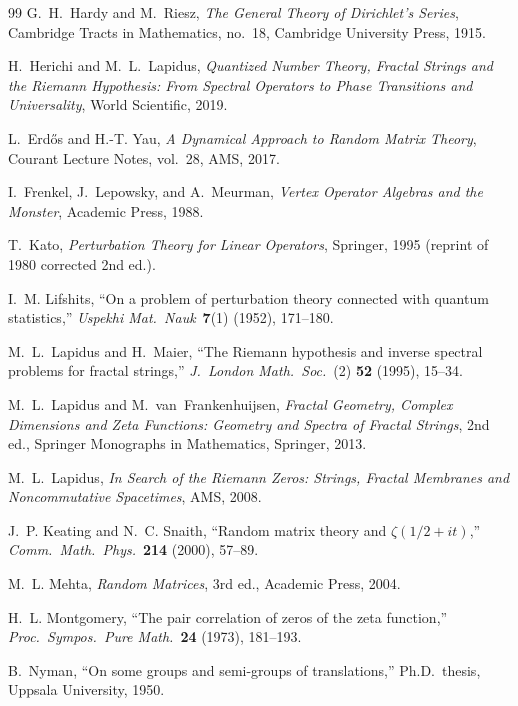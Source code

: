\documentclass[11pt,a4paper]{article}
\theoremstyle{plain}
\theoremstyle{remark}
\begin{document}
\begin{thebibliography}{99}
G.~H.~Hardy and M.~Riesz,
\emph{The General Theory of Dirichlet's Series},
Cambridge Tracts in Mathematics, no.~18, Cambridge University Press,
1915.

H.~Herichi and M.~L.~Lapidus,
\emph{Quantized Number Theory, Fractal Strings and the Riemann
Hypothesis: From Spectral Operators to Phase Transitions and
Universality},
World Scientific, 2019.

L.~Erd\H{o}s and H.-T. Yau,
\emph{A Dynamical Approach to Random Matrix Theory},
Courant Lecture Notes, vol.~28, AMS, 2017.

I.~Frenkel, J.~Lepowsky, and A.~Meurman,
\emph{Vertex Operator Algebras and the Monster},
Academic Press, 1988.

T.~Kato,
\emph{Perturbation Theory for Linear Operators},
Springer, 1995 (reprint of 1980 corrected 2nd ed.).

I.~M. Lifshits,
``On a problem of perturbation theory connected with quantum statistics,''
\emph{Uspekhi Mat.\ Nauk}\ \textbf{7}(1) (1952), 171--180.

M.~L.~Lapidus and H.~Maier,
``The Riemann hypothesis and inverse spectral problems for fractal
strings,''
\emph{J.\ London Math.\ Soc.}\ (2) \textbf{52} (1995), 15--34.

M.~L.~Lapidus and M.~van~Frankenhuijsen,
\emph{Fractal Geometry, Complex Dimensions and Zeta Functions:
Geometry and Spectra of Fractal Strings}, 2nd ed.,
Springer Monographs in Mathematics, Springer, 2013.

M.~L.~Lapidus,
\emph{In Search of the Riemann Zeros: Strings, Fractal Membranes
and Noncommutative Spacetimes},
AMS, 2008.

J.~P. Keating and N.~C. Snaith,
``Random matrix theory and $\zeta(1/2+it)$,''
\emph{Comm.\ Math.\ Phys.}\ \textbf{214} (2000), 57--89.

M.~L. Mehta,
\emph{Random Matrices}, 3rd ed., Academic Press, 2004.

H.~L. Montgomery,
``The pair correlation of zeros of the zeta function,''
\emph{Proc.\ Sympos.\ Pure Math.}\ \textbf{24} (1973), 181--193.

B.~Nyman,
``On some groups and semi-groups of translations,''
Ph.D.\ thesis, Uppsala University, 1950.


\end{thebibliography}
\end{document}

